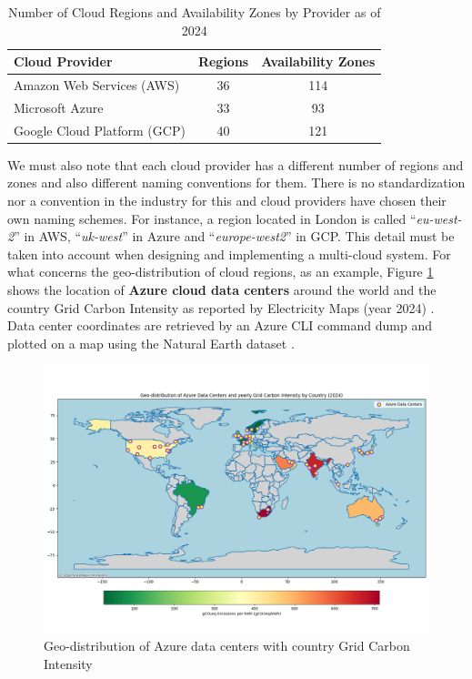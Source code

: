 \begin{table}[H]
    \centering
    \begin{tabular}{|l|c|c|}
    \hline
    \textbf{Cloud Provider} & \textbf{Regions} & \textbf{Availability Zones} \\
    \hline
    Amazon Web Services (AWS) & 36 & 114 \\
    \hline
    Microsoft Azure & 33 & 93 \\
    \hline
    Google Cloud Platform (GCP) & 40 & 121 \\
    \hline
    \end{tabular}
    \caption{Number of Cloud Regions and Availability Zones by Provider as of 2024 \cite{statista_cloud_regions}}
    \label{tab:cloud_regions_azs}
\end{table}

We must also note that each cloud provider has a different number of regions and zones and also different naming conventions for them.
There is no standardization nor a convention in the industry for this and cloud providers have chosen their own naming schemes.
For instance, a region located in London is called ``\textit{eu-west-2}'' in AWS, ``\textit{uk-west}'' in Azure and ``\textit{europe-west2}'' in GCP.
This detail must be taken into account when designing and implementing a multi-cloud system.
For what concerns the geo-distribution of cloud regions, as an example, Figure \ref{fig:azure_data_centers} shows the location of \textbf{Azure cloud data centers} around the world and the country Grid Carbon Intensity as reported by Electricity Maps (year 2024) \cite{electricity_maps}.
Data center coordinates are retrieved by an Azure CLI command dump \cite{azure_data_centers_information} and plotted on a map using the Natural Earth dataset \cite{naturalearthdata}.

\begin{figure}[htb]
    \centering
    \includegraphics[width=1\linewidth]{images/azure_data_centers.png}
    \caption{Geo-distribution of Azure data centers with country Grid Carbon Intensity}
    \label{fig:azure_data_centers}
\end{figure}

